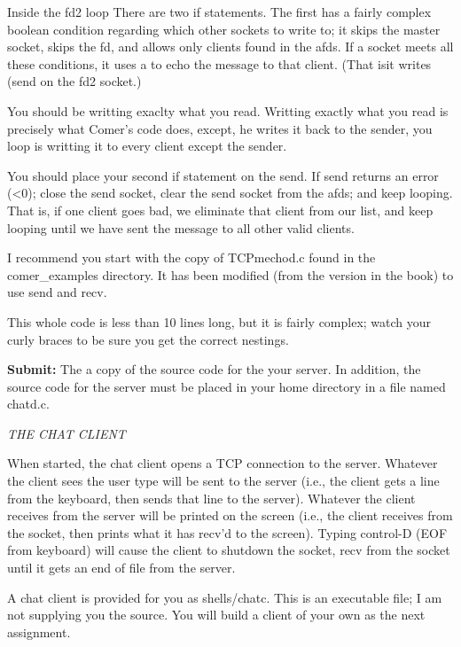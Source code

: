 Inside the {\ltt{}fd2} loop
There are two {\ltt{}if} statements.
The first has a fairly complex boolean condition regarding which
other sockets to write to; it skips the master socket,
skips the {\ltt{}fd}, and allows  only clients found in
the {\ltt{}afds}.
If a socket meets all these conditions, it uses a
to echo the message to that client.
(That isit writes ({\ltt{}send}
on the {\ltt{}fd2} socket.)

You should be writting exaclty what you read.
Writting exactly what you read is precisely what Comer's code does,
except, he writes it back to the sender, you loop is writting
it to every client except the sender.

You should place your second {\ltt{}if} statement on the {\ltt{}send}.
If {\ltt{}send} returns an error ({\ltt{}<0}); close the send socket,
clear the send socket from the {\ltt{}afds}; and keep looping.
That is, if one client goes bad, we eliminate that client from
our list, and keep looping until we have sent the message to 
all other valid clients.

I recommend you start with the copy of
{\ltt{}TCPmechod.c} found in the {\ltt{}comer_examples} directory.
It has been modified (from the version in the book)
to use {\ltt{}send} and {\ltt{}recv}.

This whole code is less than 10 lines long, but it is fairly complex;
watch your curly braces to be sure you get the correct nestings.

{\bf Submit:} The a copy of the source code for the your server.
In addition,
the source code for the server must be placed in your home directory
in a file named {\ltt{}chatd.c}.

{\it THE CHAT CLIENT}

When started, the chat client opens a TCP connection to the server.
Whatever the client sees the user type will be sent to the server 
(i.e., the client gets a line from the keyboard, 
then sends that line to the server).
Whatever the client receives from the server will be printed on the screen
(i.e., the client receives from the socket, 
then prints what it has recv'd to the screen).
Typing control-D (EOF from keyboard) will cause the client to 
shutdown the socket, recv from the socket until it gets an end of file
from the server.

A chat client is provided for you as {\ltt{}shells/chatc}.
This is an executable file; I am not supplying you the source.
You will build a client of your own as the next assignment.

\bye
